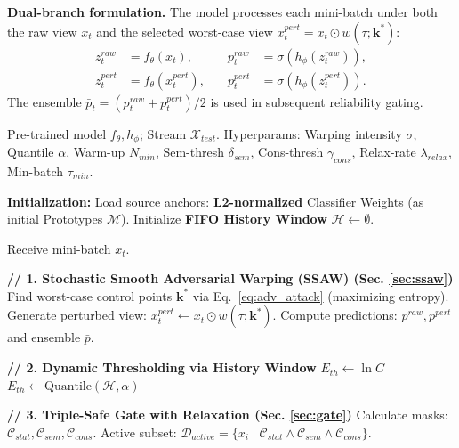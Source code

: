 \documentclass[sigconf, screen, review, anonymous]{acmart}
\theoremstyle{plain}
\theoremstyle{definition}
\theoremstyle{remark}
\begin{document}
	\textbf{Dual-branch formulation.}
	The model processes each mini-batch under both the raw view $x_t$ and the selected worst-case view $x^{pert}_t = x_t \odot w(\tau; \mathbf{k}^*)$:
	\begin{equation}
	\begin{aligned}
		z^{raw}_t &= f_{\theta}(x_t), \quad &p^{raw}_t &= \sigma(h_{\phi}(z^{raw}_t)), \\
		z^{pert}_t &= f_{\theta}(x^{pert}_t), \quad &p^{pert}_t &= \sigma(h_{\phi}(z^{pert}_t)).
	\end{aligned}
	\label{eq:dual_branch}
	\end{equation}
	The ensemble $\bar{p}_t = (p^{raw}_t + p^{pert}_t)/2$ is used in subsequent reliability gating.



\begin{algorithm}[tb]
	\caption{\textbf{NuSTAR}: Online Test-Time Adaptation via Active Purification}
	\label{alg:nustar}
	\begin{algorithmic}[1]
		\REQUIRE Pre-trained model $f_{\theta}, h_{\phi}$; Stream $\mathcal{X}_{test}$.
		\REQUIRE Hyperparams: Warping intensity $\sigma$, Quantile $\alpha$, Warm-up $N_{min}$, Sem-thresh $\delta_{sem}$, Cons-thresh $\gamma_{cons}$, Relax-rate $\lambda_{relax}$, Min-batch $\tau_{min}$.
		
		\STATE \textbf{Initialization:}
		\STATE \quad Load source anchors: \textbf{L2-normalized} Classifier Weights (as initial Prototypes $\mathcal{M}$).
		\STATE \quad Initialize \textbf{FIFO History Window} $\mathcal{H} \leftarrow \emptyset$.
		
		\STATE Receive mini-batch $x_t$.
		
		\STATE \textbf{// 1. Stochastic Smooth Adversarial Warping (SSAW) (Sec. \ref{sec:ssaw})}
		\STATE Find worst-case control points $\mathbf{k}^*$ via Eq.~\ref{eq:adv_attack} (maximizing entropy).
		\STATE Generate perturbed view: $x^{pert}_t \leftarrow x_t \odot w(\tau; \mathbf{k}^*)$.
		\STATE Compute predictions: $p^{raw}, p^{pert}$ and ensemble $\bar{p}$.
		
		\STATE \textbf{// 2. Dynamic Thresholding via History Window}
		\STATE $E_{th} \leftarrow \ln C$ 
		\ELSE
		\STATE $E_{th} \leftarrow \text{Quantile}(\mathcal{H}, \alpha)$ 
		\ENDIF
		
		\STATE \textbf{// 3. Triple-Safe Gate with Relaxation (Sec. \ref{sec:gate})}
		\STATE Calculate masks: $\mathcal{C}_{stat}, \mathcal{C}_{sem}, \mathcal{C}_{cons}$.
		\STATE Active subset: $\mathcal{D}_{active} = \{x_i \mid \mathcal{C}_{stat} \wedge \mathcal{C}_{sem} \wedge \mathcal{C}_{cons}\}$.
		

\end{algorithmic}
\end{algorithm}
\end{document}
